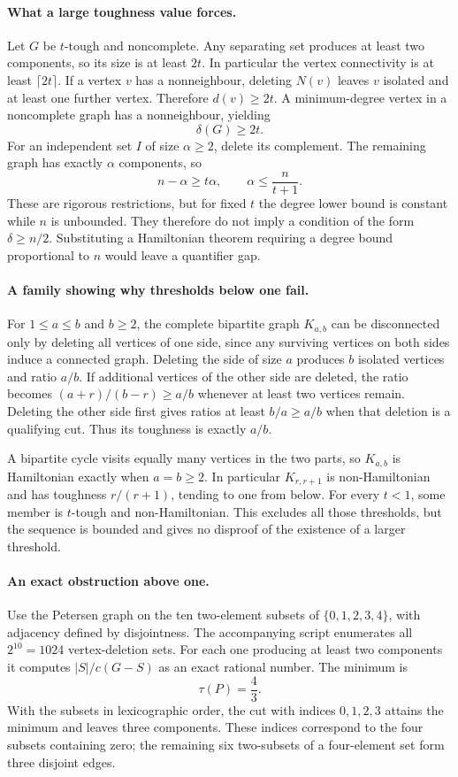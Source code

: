 \documentclass[11pt,a4paper]{article}
\begin{document}
\paragraph{What a large toughness value forces.}
Let $G$ be $t$-tough and noncomplete. Any separating set produces at
least two components, so its size is at least $2t$. In particular
the vertex connectivity is at least $\lceil2t\rceil$. If a vertex
$v$ has a nonneighbour, deleting $N(v)$ leaves $v$ isolated and at
least one further vertex. Therefore $d(v)\ge2t$. A minimum-degree
vertex in a noncomplete graph has a nonneighbour, yielding
\[
                              \delta(G)\ge2t.
\]
For an independent set $I$ of size $\alpha\ge2$, delete its complement.
The remaining graph has exactly $\alpha$ components, so
\[
                       n-\alpha\ge t\alpha,
                       \qquad \alpha\le\frac n{t+1}.
\]
These are rigorous restrictions, but for fixed $t$ the degree lower
bound is constant while $n$ is unbounded. They therefore do not imply
a condition of the form $\delta\ge n/2$. Substituting a Hamiltonian
theorem requiring a degree bound proportional to $n$ would leave a
quantifier gap.

\paragraph{A family showing why thresholds below one fail.}
For $1\le a\le b$ and $b\ge2$, the complete bipartite graph $K_{a,b}$
can be disconnected only by deleting all vertices of one side, since
any surviving vertices on both sides induce a connected graph.
Deleting the side of size $a$ produces $b$ isolated vertices and
ratio $a/b$. If additional vertices of the other side are deleted,
the ratio becomes $(a+r)/(b-r)\ge a/b$ whenever at least two
vertices remain. Deleting the other side first gives ratios at least
$b/a\ge a/b$ when that deletion is a qualifying cut. Thus its
toughness is exactly $a/b$.

A bipartite cycle visits equally many vertices in the two parts, so
$K_{a,b}$ is Hamiltonian exactly when $a=b\ge2$. In particular
$K_{r,r+1}$ is non-Hamiltonian and has toughness $r/(r+1)$, tending
to one from below. For every $t<1$, some member is $t$-tough and
non-Hamiltonian. This excludes all those thresholds, but the sequence
is bounded and gives no disproof of the existence of a larger threshold.

\paragraph{An exact obstruction above one.}
Use the Petersen graph on the ten two-element subsets of
$\{0,1,2,3,4\}$, with adjacency defined by disjointness. The accompanying
script enumerates all $2^{10}=1024$ vertex-deletion sets. For each
one producing at least two components it computes $|S|/c(G-S)$ as
an exact rational number. The minimum is
\[
                             \tau(P)=\frac43.
\]
With the subsets in lexicographic order, the cut with indices
$0,1,2,3$ attains the minimum and leaves three components. These
indices correspond to the four subsets containing zero; the remaining
six two-subsets of a four-element set form three disjoint edges.
\end{document}
